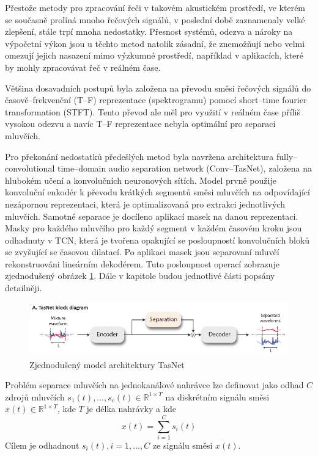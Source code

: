 Přestože metody pro zpracování řeči v takovém akustickém prostředí, ve kterém se současně prolíná mnoho řečových signálů, v poslední době zaznamenaly velké zlepšení, stále trpí mnoha nedostatky. Přesnost systémů, odezva a nároky na výpočetní výkon jsou u těchto metod natolik zásadní, že znemožňují nebo velmi omezují jejich nasazení mimo výzkumné prostředí, například v aplikacích, které by mohly zpracovávat řeč v reálném čase.

Většina dosavadních postupů byla založena na převodu směsi řečových signálů do časově--frekvenční (T--F) reprezentace (spektrogramu) pomocí short--time fourier transformation (STFT)\cite{speechseparationoverview}. Tento převod ale měl pro využití v reálném čase příliš vysokou odezvu a navíc T--F reprezentace nebyla optimální pro separaci mluvčích.

Pro překonání nedostatků předešlých metod byla navržena architektura fully--convolutional time--domain audio separation network (Conv--TasNet), založena na hlubokém učení a konvolučních neuronových sítích. Model prvně použije konvoluční enkodér k převodu krátkých segmentů směsi mluvčích na odpovídající nezápornou reprezentaci, která je optimalizovaná pro extrakci jednotlivých mluvčích. Samotné separace je docíleno aplikací masek na danou reprezentaci. Masky pro každého mluvčího pro každý segment v každém časovém kroku jsou odhadnuty v TCN, která je tvořena opakující se posloupností konvolučních bloků se zvyšující se časovou dilatací. Po aplikaci masek jsou separovaní mluvčí rekonstruováni lineárním dekodérem. Tuto posloupnost operací zobrazuje zjednodušený obrázek \ref{fig:tasnet-pipe}. Dále v kapitole budou jednotlivé části popsány detailněji.

\begin{figure}[H]
    \centering
    \includegraphics[scale=0.5]{obrazky-figures/tasnet-pipe.png}
    \caption{\label{fig:tasnet-pipe}Zjednodušený model architektury TasNet}
\end{figure}

Problém separace mluvčích na jednokanálové nahrávce lze definovat jako odhad $C$ zdrojů mluvčích $s_1(t), \dots, s_c(t) \in \mathbb{R}^{1 \times T}$ na diskrétním signálu směsi $x(t)\in \mathbb{R}^{1 \times T}$, kde $T$ je délka nahrávky a kde
\begin{equation}
  x(t) = \sum_{i=1}^C s_i(t)
\end{equation}
Cílem je odhadnout $s_i(t), i = 1, \dots, C$ ze signálu směsi $x(t)$.

